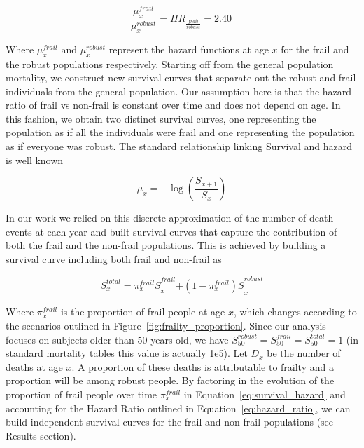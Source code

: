 \begin{equation}\label{eq:hazard_ratio}
\frac{\mu_{x}^{frail}}{\mu_{x}^{robust}} = {HR}_{\frac{frail}{robust}} = 2.40\ 
\end{equation}

Where $\mu_{x}^{frail}$ and $\mu_{x}^{robust}$ represent the hazard functions at age $x$ for the frail and the robust populations respectively. Starting off from the general population mortality, we construct new survival curves that separate out the robust and frail individuals from the general population. Our assumption here is that the hazard ratio of frail vs non-frail is constant over time and does not depend on age. In this fashion, we obtain two distinct survival curves, one representing the population as if all the individuals were frail and one representing the population as if everyone was robust. The standard relationship linking Survival and hazard is well known\cite{Kleinbaum2012}

\begin{equation}\label{eq:survival_hazard}
\mu_{x} = - \log\left( \frac{S_{x + 1}}{S_{x}} \right)
\end{equation}

In our work we relied on this discrete approximation of the number of death events at each year and built survival curves that capture the contribution of both the frail and the non-frail populations. This is achieved by building a survival curve including both frail and non-frail as

\begin{equation}\label{eq:survival_total}
{S_{x}^{total} = \pi_{x}^{frail}S}_{x}^{frail}{+ \left( 1 - \pi_{x}^{frail} \right)S}_{x}^{robust}
\end{equation}

Where $\pi_{x}^{frail}$ is the proportion of frail people at age $x$, which changes according to the scenarios outlined in Figure~\ref{fig:frailty_proportion}. Since our analysis focuses on subjects older than 50 years old, we have $S_{50}^{robust} = S_{50}^{frail} = S_{50}^{total} = 1$ (in standard mortality tables this value is actually 1e5). Let $D_{x}$ be the number of deaths at age $x$. A proportion of these deaths is attributable to frailty and a proportion will be among robust people. By factoring in the evolution of the proportion of frail people over time $\pi_{x}^{frail}$ in Equation~\eqref{eq:survival_hazard} and accounting for the Hazard Ratio outlined in Equation~\eqref{eq:hazard_ratio}, we can build independent survival curves for the frail and non-frail populations (see Results section).

